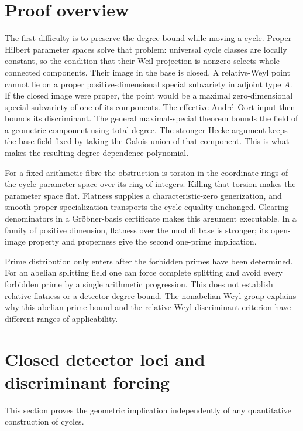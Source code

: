 \documentclass[11pt]{article}
\theoremstyle{definition}
\theoremstyle{remark}
\begin{document}
\section{Proof overview}

The first difficulty is to preserve the degree bound while moving
a cycle. Proper Hilbert parameter spaces solve that problem:
universal cycle classes are locally constant, so the condition
that their Weil projection is nonzero selects whole connected
components. Their image in the base is closed. A relative-Weyl
point cannot lie on a proper positive-dimensional special
subvariety in adjoint type $A$. If the closed image were proper,
the point would be a maximal zero-dimensional special subvariety
of one of its components. The effective Andr\'e--Oort input then
bounds its discriminant. The general maximal-special theorem bounds the field of a geometric
component using total degree.  The stronger Hecke argument keeps the
base field fixed by taking the Galois union of that component.  This
is what makes the resulting degree dependence polynomial.

For a fixed arithmetic fibre the obstruction is torsion in the
coordinate rings of the cycle parameter space over its ring of
integers. Killing that torsion makes the parameter space flat.
Flatness supplies a characteristic-zero generization, and smooth
proper specialization transports the cycle equality unchanged.
Clearing denominators in a Gr\"obner-basis certificate makes this
argument executable. In a family of positive dimension, flatness
over the moduli base is stronger; its open-image property and
properness give the second one-prime implication.

Prime distribution only enters after the forbidden primes have
been determined. For an abelian splitting field one can force
complete splitting and avoid every forbidden prime by a single
arithmetic progression. This does not establish relative flatness
or a detector degree bound. The nonabelian Weyl group explains
why this abelian prime bound and the relative-Weyl discriminant
criterion have different ranges of applicability.

\section{Closed detector loci and discriminant forcing}

This section proves the geometric implication independently of
any quantitative construction of cycles.
\end{document}
